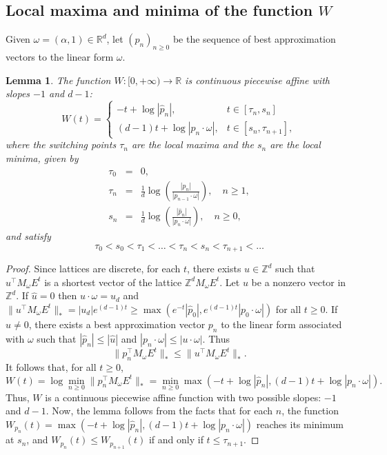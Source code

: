 \documentclass[12pt,reqno,a4paper]{amsart}%
\numberwithin{equation}{section}
\newtheorem{lemma}[theorem]{Lemma}
\newcommand{\Rr}{{\mathbb{R}}}
\newcommand{\Zz}{{\mathbb{Z}}}
\begin{document}
	\subsection{Local maxima and  minima of the function $W$}
	Given $\omega=(\alpha,1)\in\Rr^d$, let $(p_n)_{n\geq0}$ be the sequence of best approximation vectors to the linear form $\omega$.
	\begin{lemma}\label{lem:W}
		The function $W\colon[0,+\infty)\to\Rr$ is continuous piecewise affine with slopes $-1$ and $d-1$:
		\[
		W(t) =
		\begin{cases}
			-t + \log|\hat p_n|, & t \in [\tau_n, s_n]\\
			(d-1)t + \log|p_n \cdot \omega|, & t \in [s_n, \tau_{n+1}],
		\end{cases}
		\]
		where the switching points $\tau_n$ are the local maxima and the $s_n$ are the local minima,  given by
\begin{eqnarray*}
\tau_0&=&0,\\
\tau_n &=& \frac{1}{d} \log \left( \frac{|\hat p_n|}{|p_{n-1} \cdot \omega|} \right),
\quad
n\geq 1, \\
s_n &=& \frac{1}{d} \log \left( \frac{|\hat p_n|}{|p_n \cdot \omega|} \right),
\quad
n\geq 0,
\end{eqnarray*}
		and satisfy
		\[
		 \tau_0 < s_0 < \tau_1 < \dots < \tau_n < s_n < \tau_{n+1} < \dots
		\]
	\end{lemma}
	
	
	
	\begin{proof}
		Since lattices are discrete, for each $t$, there exists $u \in \Zz^d$ such that $u^\top M_\omega E^t$ is a shortest vector of the lattice $\Zz^d M_\omega E^t$. Let $u$ be a nonzero vector in $ \Zz^d$. If $\hat u=0$ then $u\cdot\omega=u_d$ and  $\|u^{\top }M_{\omega}E^t\|_*=|u_d|e^{(d-1)t}\geq \max(e^{-t}|\hat p_0|,e^{(d-1)t}|p_0\cdot \omega|)$ for all $t\geq 0$. If $\hat u \neq 0$, there exists a best approximation vector $p_n$ to the linear form associated with $\omega$ such that $|\hat p_n| \leq |\hat u|$ and $|p_n \cdot \omega| \leq |u \cdot \omega|$. Thus
		\[
		\|p_n^{\top} M_\omega E^t\|_* \leq \|u^{\top} M_\omega E^t\|_*.
		\]
		It follows that, for all $t\geq 0$,
		\[
		W(t) = \log \min_{n \geq 0} \|p_n^{\top} M_\omega E^t\|_* = \min_{n \geq 0} \max\left(-t + \log|\hat p_n|, (d-1)t + \log|p_n \cdot \omega|\right).
		\]
		Thus, $W$ is a continuous piecewise affine function with two possible slopes: $-1$ and $d-1$. Now, the lemma follows from the facts that for each $n$, the function $W_{p_n}(t) = \max(-t + \log|\hat p_n|, (d-1)t + \log|p_n \cdot \omega|)$ reaches its minimum at $s_n$, and $W_{p_n}(t) \leq W_{p_{n+1}}(t)$ if and only if $t \leq \tau_{n+1}$.
	\end{proof}
	
\end{document}
